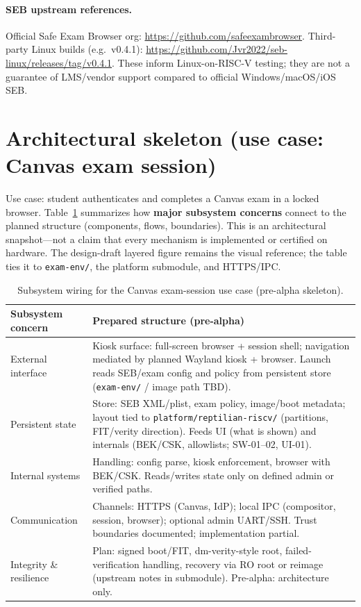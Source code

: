 \documentclass[10pt]{article}
\begin{document}
\paragraph{SEB upstream references.}
Official Safe Exam Browser org: \url{https://github.com/safeexambrowser}. Third-party Linux builds (e.g.\ v0.4.1): \url{https://github.com/Jvr2022/seb-linux/releases/tag/v0.4.1}. These inform Linux-on-RISC-V testing; they are not a guarantee of LMS/vendor support compared to official Windows/macOS/iOS SEB.

\section{Architectural skeleton (use case: Canvas exam session)}

Use case: student authenticates and completes a Canvas exam in a locked browser. Table~\ref{tab:subsystem} summarizes how \textbf{major subsystem concerns} connect to the planned structure (components, flows, boundaries). This is an architectural snapshot---not a claim that every mechanism is implemented or certified on hardware. The design-draft layered figure remains the visual reference; the table ties it to \texttt{exam-env/}, the platform submodule, and HTTPS/IPC.

\begin{table}[H]
  \centering
  \footnotesize
  \setlength{\tabcolsep}{3pt}
  \begin{tabularx}{\textwidth}{@{}p{}X@{}}
    \toprule
    \textbf{Subsystem concern} & \textbf{Prepared structure (pre-alpha)} \\
    \midrule
    External interface &
    Kiosk surface: full-screen browser + session shell; navigation mediated by planned Wayland kiosk + browser. Launch reads SEB/exam config and policy from persistent store (\texttt{exam-env/} / image path TBD). \\
    Persistent state &
    Store: SEB XML/plist, exam policy, image/boot metadata; layout tied to \texttt{platform/reptilian-riscv/} (partitions, FIT/verity direction). Feeds UI (what is shown) and internals (BEK/CSK, allowlists; SW-01--02, UI-01). \\
    Internal systems &
    Handling: config parse, kiosk enforcement, browser with BEK/CSK. Reads/writes state only on defined admin or verified paths. \\
    Communication &
    Channels: HTTPS (Canvas, IdP); local IPC (compositor, session, browser); optional admin UART/SSH. Trust boundaries documented; implementation partial. \\
    Integrity \& resilience &
    Plan: signed boot/FIT, dm-verity-style root, failed-verification handling, recovery via RO root or reimage (upstream notes in submodule). Pre-alpha: architecture only. \\
    \bottomrule
  \end{tabularx}
  \caption{Subsystem wiring for the Canvas exam-session use case (pre-alpha skeleton).}
  \label{tab:subsystem}
\end{table}
\end{document}
